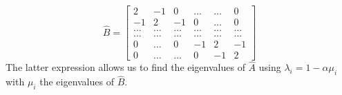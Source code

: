 \documentclass[a4paper, twoside, 11pt]{report}
\theoremstyle{theorem}
\theoremstyle{remark}
\theoremstyle{exemple}
\begin{document}
                    \begin{equation*}
                        \hat{B} =\left[\begin{matrix}
                                     2 & -1 & 0 & \dots & \dots & 0 \\
                                     -1 & 2 & -1 & 0 & \dots & 0 \\
                                     \dots & \dots & \dots & \dots & \dots & \dots\\
                                     \dots & \dots & \dots & \dots & \dots & \dots\\
                                     0 & \dots & 0 & -1 & 2 & -1 \\
                                     0 & \dots & \dots & 0 & -1 & 2
                                  \end{matrix} \right]
                    \end{equation*}
                    The latter expression allows us to find the eigenvalues of $\hat{A}$ using $\lambda_i=1-\alpha \mu_i$ with $\mu_i$ the eigenvalues of $\hat{B}$.
\end{document}
